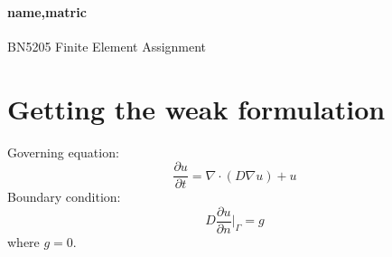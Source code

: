 \documentclass[11pt, a4paper]{article}
\begin{document}
  \paragraph{name,matric} BN5205 Finite Element Assignment
  \section{Getting the weak formulation}
  Governing equation:
  \begin{equation}
  \frac{\partial u}{\partial t} = \nabla \cdot (D \nabla u) + u
  \end{equation}
  Boundary condition:
  \begin{equation}
  D \frac{\partial u}{\partial n} |_{\Gamma} = g
  \end{equation}
  where $g = 0$.
  
\end{document}
